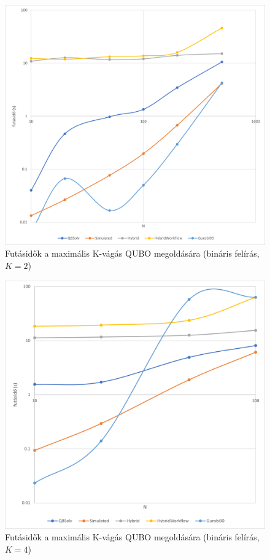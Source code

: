 \begin{figure}[!ht]
	\centering
	\includegraphics[width=150mm, keepaspectratio]{figures/diagrams/maxKCutQUBO_K2_bin.png}
	\caption{Futásidők a maximális K-vágás QUBO megoldására (bináris felírás, $K=2$)}
	\label{fig:maxKCutQUBO_K2_bin}
\end{figure}

\begin{figure}[!ht]
	\centering
	\includegraphics[width=150mm, keepaspectratio]{figures/diagrams/maxKCutQUBO_K4_bin.png}
	\caption{Futásidők a maximális K-vágás QUBO megoldására (bináris felírás, $K=4$)}
	\label{fig:maxKCutQUBO_K4_bin}
\end{figure}
